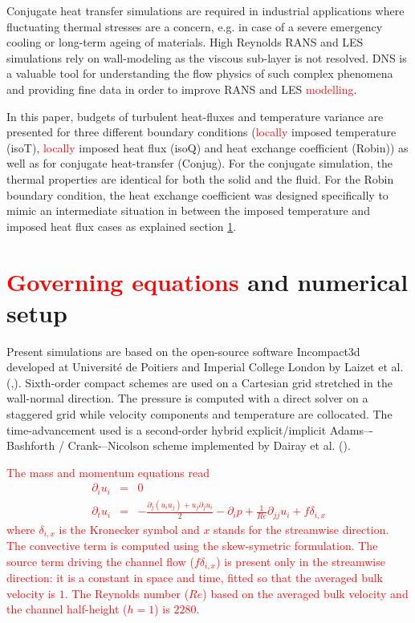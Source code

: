 \documentclass[review]{elsarticle}
\begin{document}
Conjugate heat transfer simulations are required in industrial applications where fluctuating thermal stresses are a concern, e.g. in case of a severe emergency cooling or long-term ageing of materials.
High Reynolds RANS and LES simulations rely on wall-modeling as the viscous sub-layer is not resolved.
DNS is a valuable tool for understanding the flow physics of such complex phenomena and providing fine data in order to improve RANS and LES \textcolor{red}{modelling}.

In this paper, budgets of turbulent heat-fluxes and temperature variance are presented for three different boundary conditions (\textcolor{red}{locally} imposed temperature (isoT), \textcolor{red}{locally} imposed heat flux (isoQ) and heat exchange coefficient (Robin)) as well as for conjugate heat-transfer (Conjug). For the conjugate simulation, the thermal properties are identical for both the solid and the fluid. For the Robin boundary condition, the heat exchange coefficient was designed specifically to mimic an intermediate situation in between the imposed temperature and imposed heat flux cases as explained section \ref{sec_num_set}.

\section{\textcolor{red}{Governing equations} and numerical setup} \label{sec_num_set}
Present simulations are based on the open-source software Incompact3d developed at Universit\'e de Poitiers  and  Imperial  College  London by Laizet et al. (\cite{LaizetJCP2009},\cite{LaizetLi2011}).
Sixth-order compact schemes are used on a Cartesian grid stretched in the wall-normal direction.
The pressure is computed with a direct solver on a staggered grid while velocity components and temperature are collocated.
The time-advancement used is a second-order hybrid explicit/implicit  Adams–-Bashforth / Crank-–Nicolson scheme implemented by Dairay et al. (\cite{Dairay2014}).

\textcolor{red}{The mass and momentum equations read
\begin{eqnarray}
\partial_i u_i & = & 0 \nonumber \\
\partial_t u_i & = & - \frac{\partial_j \left( u_i u_j \right) + u_j \partial_j u_i}{2} - \partial_i p + \frac{1}{Re} \partial_{jj} u_i + f \delta_{i,x}
\end{eqnarray}
where $\delta_{i,x}$ is the Kronecker symbol and $x$ stands for the streamwise direction.
The convective term is computed using the skew-symetric formulation.
The source term driving the channel flow ($f \delta_{i,x}$) is present only in the streamwise direction: it is a constant in space and time, fitted so that the averaged bulk velocity is $1$.
The Reynolds number ($Re$) based on the averaged bulk velocity and the channel half-height ($h=1$) is $2280$.}
\end{document}

